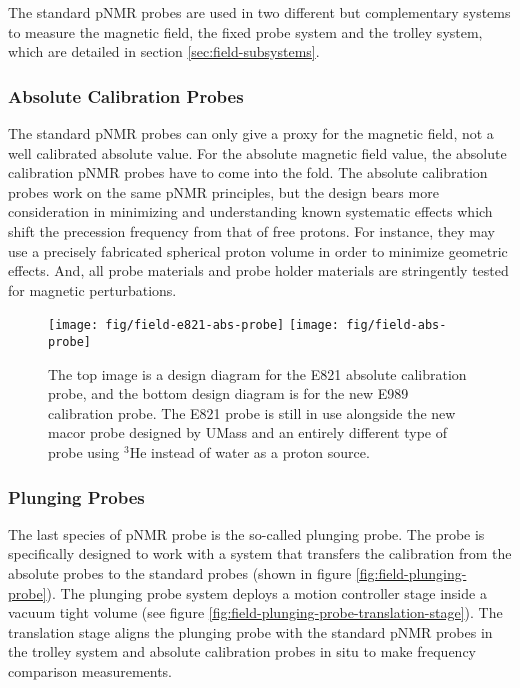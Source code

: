 The standard pNMR probes are used in two different but complementary systems to measure the magnetic field, the fixed probe system and the trolley system, which are detailed in section \ref{sec:field-subsystems}.

\subsubsection{Absolute Calibration Probes}

The standard pNMR probes can only give a proxy for the magnetic field, not a well calibrated absolute value.  For the absolute magnetic field value, the absolute calibration pNMR probes have to come into the fold.  The absolute calibration probes work on the same pNMR principles, but the design bears more consideration in minimizing and understanding known systematic effects which shift the precession frequency from that of free protons.  For instance, they may use a precisely fabricated spherical proton volume in order to minimize geometric effects.  And, all probe materials and probe holder materials are stringently tested for magnetic perturbations.

\begin{figure}
\label{fig:field-e821-abs-probe}
\centering
\texttt{[image: fig/field-e821-abs-probe]}
\texttt{[image: fig/field-abs-probe]}
\caption{The top image is a design diagram for the E821 absolute calibration probe, and the bottom design diagram is for the new E989 calibration probe.  The E821 probe is still in use alongside the new macor probe designed by UMass and an entirely different type of probe using $\mathrm{^3He}$ instead of water as a proton source.}
\end{figure}

\subsubsection{Plunging Probes}

The last species of pNMR probe is the so-called plunging probe. The probe is specifically designed to work with a system that transfers the calibration from the absolute probes to the standard probes (shown in figure \ref{fig:field-plunging-probe}).  The plunging probe system deploys a motion controller stage inside a vacuum tight volume (see figure \ref{fig:field-plunging-probe-translation-stage}).  The translation stage aligns the plunging probe with the standard pNMR probes in the trolley system and absolute calibration probes in situ to make frequency comparison measurements.

